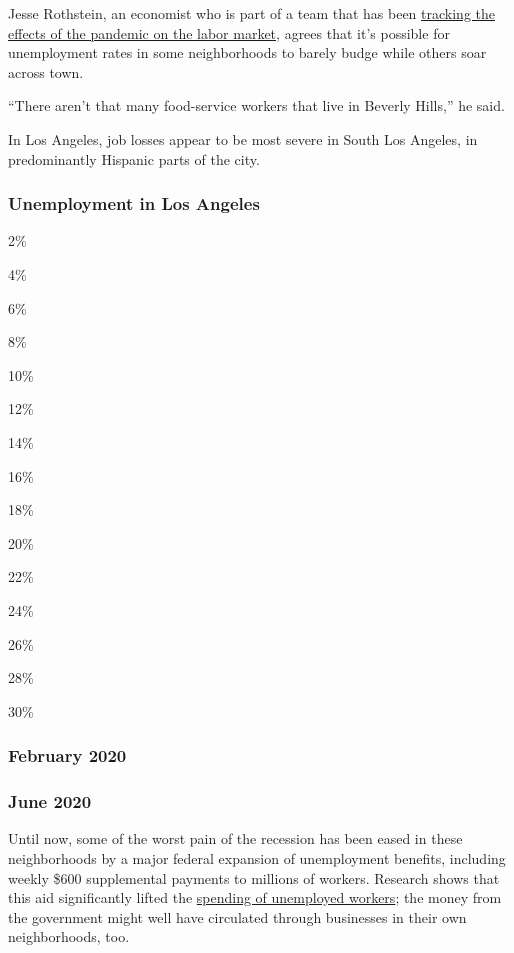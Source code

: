 Jesse Rothstein, an economist who is part of a team that has been
\href{https://irle.berkeley.edu/labor-market-impacts-of-covid-19-on-hourly-workers-in-small-and-medium-sized-businesses-four-facts-from-homebase-data-2/}{tracking
the effects of the pandemic on the labor market}, agrees that it's
possible for unemployment rates in some neighborhoods to barely budge
while others soar across town.

``There aren't that many food-service workers that live in Beverly
Hills,'' he said.

In Los Angeles, job losses appear to be most severe in South Los
Angeles, in predominantly Hispanic parts of the city.

\hypertarget{unemployment-in-los-angeles}{%
\subsubsection{Unemployment in Los
Angeles}\label{unemployment-in-los-angeles}}

2\%

4\%

6\%

8\%

10\%

12\%

14\%

16\%

18\%

20\%

22\%

24\%

26\%

28\%

30\%

\hypertarget{february-2020-2}{%
\subsubsection{February 2020}\label{february-2020-2}}

\hypertarget{june-2020-2}{%
\subsubsection{June 2020}\label{june-2020-2}}

Until now, some of the worst pain of the recession has been eased in
these neighborhoods by a major federal expansion of unemployment
benefits, including weekly \$600 supplemental payments to millions of
workers. Research shows that this aid significantly lifted the
\href{https://www.nytimes.com/live/2020/07/16/business/stock-market-today-coronavirus\#adding-600-to-weekly-jobless-pay-is-found-to-be-an-economic-tonic}{spending
of unemployed workers}; the money from the government might well have
circulated through businesses in their own neighborhoods, too.

